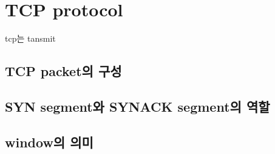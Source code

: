 \section{TCP protocol}

tcp는 tansmit 
\subsection{TCP packet의 구성}

\subsection{SYN segment와 SYNACK segment의 역할}

\subsection{window의 의미}